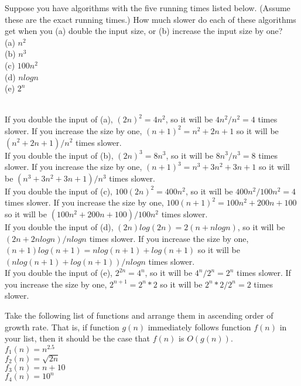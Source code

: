 \documentclass{assignment}
\begin{document}
\begin{problemlist}
\clearpage
\pbitem
\begin{problem}
Suppose you have algorithms with the five running times listed below. (Assume these are the exact running times.) How much slower do each of these algorithms get when you (a) double the input size, or (b) increase the input size by one?\\
(a) $n^2$\\
(b) $n^3$\\
(c) $100n^2$\\
(d) $nlogn$\\
(e) $2^n$\\
\end{problem}
\begin{answer}
\\
If you double the input of (a), $(2n)^2=4n^2$, so it will be $4n^2/n^2=4$ times slower. If you increase the size by one, $(n+1)^2=n^2+2n+1$ so it will be $(n^2+2n+1)/n^2$ times slower.\\
If you double the input of (b), $(2n)^3=8n^3$, so it will be $8n^3/n^3=8$ times slower. If you increase the size by one, $(n+1)^3=n^3+3n^2+3n+1$ so it will be $(n^3+3n^2+3n+1)/n^3$ times slower.\\
If you double the input of (c), $100(2n)^2=400n^2$, so it will be $400n^2/100n^2=4$ times slower. If you increase the size by one, $100(n+1)^2=100n^2+200n+100$ so it will be $(100n^2+200n+100)/100n^2$ times slower.\\
If you double the input of (d), $(2n)log(2n)=2(n+nlogn)$, so it will be $(2n+2nlogn)/nlogn$ times slower. If you increase the size by one, $(n+1)log(n+1)=nlog(n+1)+log(n+1)$ so it will be $(nlog(n+1)+log(n+1))/nlogn$ times slower.\\
If you double the input of (e), $2^{2n}=4^n$, so it will be $4^n/2^n=2^n$ times slower. If you increase the size by one, $2^{n+1}=2^n*2$ so it will be $2^n*2/2^n=2$ times slower.
\end{answer}
\clearpage
\pbitem
\begin{problem}
Take the following list of functions and arrange them in ascending order of growth rate. That is, if function $g(n)$ immediately follows function $f(n)$ in your list, then it should be the case that $f(n)$ is $O(g(n))$.\\
$f_1(n)=n^{2.5}$\\
$f_2(n)=\sqrt{2n}$\\
$f_3(n)=n+10$\\
$f_4(n)=10^n$\\

\end{problem}
\end{problemlist}
\end{document}
